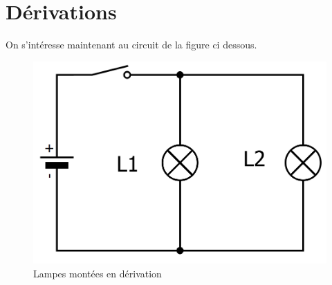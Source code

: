 \documentclass[a4paper,11pt]{exam}
\begin{document}
\newpage
\section{Dérivations}

On s'intéresse maintenant au circuit de la figure ci dessous.

\begin{figure}[h!]
	\begin{center}
	\includegraphics[scale=0.20]{img/drv}
\end{center}
	\label{fig:drv}
	\caption{Lampes montées en dérivation}
\end{figure}
\end{document}
